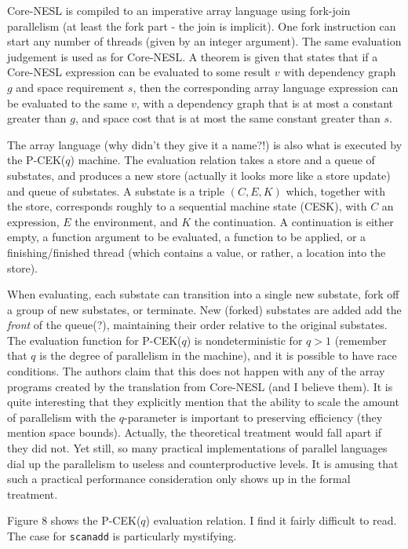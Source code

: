 \documentclass[a4paper, oneside, final]{memoir}
\begin{document}
Core-NESL is compiled to an imperative array language using fork-join
parallelism (at least the fork part - the join is implicit).  One fork
instruction can start any number of threads (given by an integer
argument).  The same evaluation judgement is used as for Core-NESL.  A
theorem is given that states that if a Core-NESL expression can be
evaluated to some result $v$ with dependency graph $g$ and space
requirement $s$, then the corresponding array language expression can
be evaluated to the same $v$, with a dependency graph that is at most
a constant greater than $g$, and space cost that is at most the same
constant greater than $s$.

The array language (why didn't they give it a name?!) is also what is
executed by the P-CEK($q$) machine.  The evaluation relation takes a
store and a queue of substates, and produces a new store (actually it
looks more like a store update) and queue of substates.  A substate is
a triple $(C,E,K)$ which, together with the store, corresponds roughly
to a sequential machine state (CESK), with $C$ an expression, $E$ the
environment, and $K$ the continuation.  A continuation is either
empty, a function argument to be evaluated, a function to be applied,
or a finishing/finished thread (which contains a value, or rather, a
location into the store).

When evaluating, each substate can transition into a single new
substate, fork off a group of new substates, or terminate.  New
(forked) substates are added add the \textit{front} of the queue(?),
maintaining their order relative to the original substates.  The
evaluation function for P-CEK($q$) is nondeterministic for $q > 1$
(remember that $q$ is the degree of parallelism in the machine), and
it is possible to have race conditions.  The authors claim that this
does not happen with any of the array programs created by the
translation from Core-NESL (and I believe them).  It is quite
interesting that they explicitly mention that the ability to scale the
amount of parallelism with the $q$-parameter is important to
preserving efficiency (they mention space bounds).  Actually, the
theoretical treatment would fall apart if they did not.  Yet still, so
many practical implementations of parallel languages dial up the
parallelism to useless and counterproductive levels.  It is amusing
that such a practical performance consideration only shows up in the
formal treatment.

Figure 8 shows the P-CEK($q$) evaluation relation.  I find it fairly
difficult to read.  The case for \texttt{scanadd} is particularly
mystifying.
\end{document}
